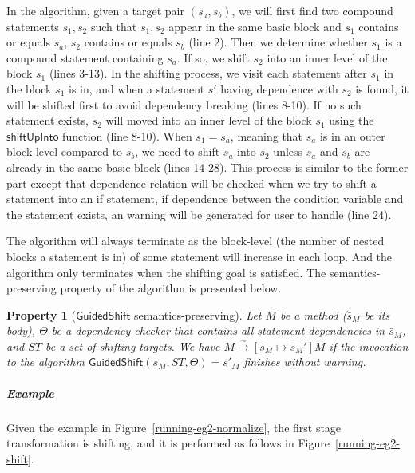 \documentclass[a4paper, USenglish]{lipics-v2016}
\theoremstyle{plain}
\newtheorem{property}[theorem]{Property}
\begin{document}
In the algorithm, given a target pair $(s_a, s_b)$, we will first
 find two compound statements $s_1, s_2$ such that $s_1,s_2$ appear in the same basic block and $s_1$ contains or equals $s_a$, $s_2$ contains or equals $s_b$ (line 2). Then we determine whether $s_1$ is a compound statement containing $s_a$. If so, we shift $s_2$ into an inner level of the block $s_1$ (lines 3-13). In the shifting process, we visit each statement after $s_1$ in the block $s_1$ is in, and when a statement $s'$ having dependence with $s_2$ is found, it will be shifted first to avoid dependency breaking (lines 8-10). If no such statement exists, $s_2$ will moved into an inner level of the block $s_1$ using the $\mathsf{shiftUpInto}$ function (line 8-10). When $s_1=s_a$, meaning that $s_a$ is in an outer block level compared to $s_b$, we need to shift $s_a$ into $s_2$ unless $s_a$ and $s_b$ are already in the same basic block (lines 14-28). This process is similar to the former part except that dependence relation will be checked when we try to shift a statement into an if statement, if dependence between the condition variable and the statement exists, an warning will be generated for user to handle (line 24). 

The algorithm will always terminate as the block-level (the number of nested blocks a statement is in) of some statement will increase in each loop. And the algorithm only terminates when the shifting goal is satisfied. The semantics-preserving property of the algorithm is presented below.

\begin{property}[$\mathsf{GuidedShift}$ semantics-preserving]\label{property:guidedshiftsafe}
Let $M$ be a method ($\bar{s}_M$ be its body), $\Theta$ be a dependency
checker that contains all statement dependencies in $\bar{s}_M$, and
$\mathit{ST}$ be a set of shifting targets. We have
$M\xrightarrow{\sim}[\bar{s}_M\mapsto\bar{s}_M']M$ if the invocation
to the algorithm
$\mathsf{GuidedShift}(\bar{s}_M,\mathit{ST},\Theta)=\bar{s}'_M$
finishes without warning.  
\end{property}

\subparagraph*{Example} Given the example in Figure~\ref{running-eg2-normalize}, the first stage transformation is shifting, and it is performed as follows in Figure~\ref{running-eg2-shift}.
\end{document}
